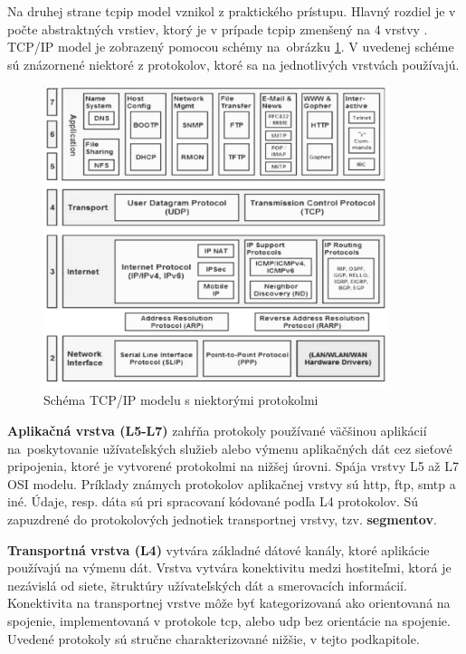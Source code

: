 Na druhej strane \acrshort{tcpip} model vznikol z praktického prístupu. Hlavný rozdiel je v počte abstraktných vrstiev, ktorý je v prípade \acrshort{tcpip} zmenšený na 4 vrstvy \cite{tcp}. 
TCP/IP model je zobrazený pomocou schémy na~obrázku \ref{tcpipprot}. V uvedenej schéme sú znázornené niektoré z protokolov, ktoré sa na jednotlivých vrstvách používajú.

\begin{figure}[!ht]
	\centering
	\includegraphics[width=0.9\textwidth]{figures/tcpiprot}
	\caption{Schéma TCP/IP modelu s niektorými protokolmi}
	\label{tcpipprot}
\end{figure}

\textbf{Aplikačná vrstva (L5-L7)} zahŕňa protokoly používané väčšinou aplikácií na~poskytovanie užívateľských služieb alebo výmenu aplikačných dát cez sieťové pripojenia, ktoré je vytvorené protokolmi na nižšej úrovni.  Spája vrstvy L5 až L7 OSI modelu. Príklady známych protokolov aplikačnej vrstvy sú \acrfull{http}, \acrfull{ftp}, \acrfull{smtp} a iné. Údaje, resp. dáta sú pri spracovaní kódované podľa L4 protokolov. Sú zapuzdrené do protokolových jednotiek transportnej vrstvy, tzv. \textbf{segmentov}.  

\textbf{Transportná vrstva (L4)} vytvára základné dátové kanály, ktoré aplikácie používajú na výmenu dát. Vrstva vytvára konektivitu medzi hostiteľmi, ktorá je nezávislá od siete, štruktúry užívateľských dát a smerovacích informácií. Konektivita na transportnej vrstve môže byť kategorizovaná ako orientovaná na spojenie, implementovaná v protokole \acrshort{tcp}, alebo \acrshort{udp} bez orientácie na spojenie. Uvedené protokoly sú stručne charakterizované nižšie, v tejto podkapitole. 

